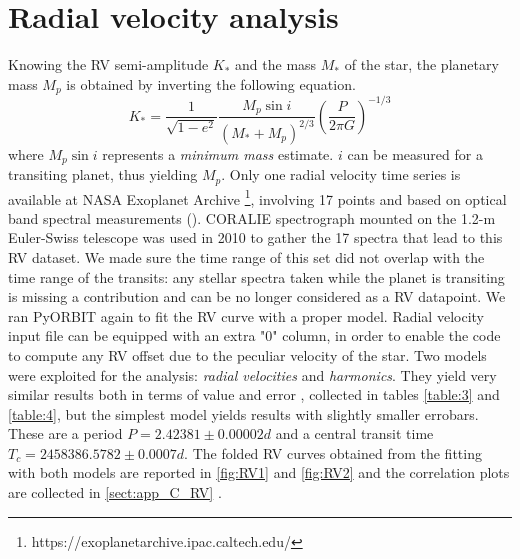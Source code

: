 \documentclass[a4paper,11pt,twocolumn]{article}
\begin{document}
\section{Radial velocity analysis}
Knowing the RV semi-amplitude $K_*$ and the mass $M_*$ of the star,
the planetary mass $M_p$ is obtained by inverting the following equation. 
\begin{equation}
    K_* = \frac{1}{\sqrt{1-e^2}}\frac{M_p \sin{i}}{(M_*+M_p)^{2/3}}\left(\frac{P}{2\pi G}\right)^{-1/3}
\end{equation}
where $M_p\sin{i}$ represents a \textit{minimum mass} estimate. $i$ can be 
measured for a transiting planet, thus yielding $M_p$. 
Only one radial velocity time series
is available at NASA Exoplanet Archive \footnote{https://exoplanetarchive.ipac.caltech.edu/}, 
involving 17 points and based on optical band spectral measurements 
(\cite{Anderson}). CORALIE spectrograph mounted on the 1.2-m
Euler-Swiss telescope was used in 2010 to gather the 17 spectra that lead
to this RV dataset. We made sure the time range of this set did not overlap 
with the time range of the transits: any stellar spectra taken while the planet is 
transiting is missing a contribution and can be no longer considered as a RV 
datapoint.
We ran PyORBIT again to fit the RV curve with a proper model. Radial velocity input
file can be equipped with an extra "0" column, in order to enable the code to compute
any RV offset due to the peculiar velocity of the star.
Two models were exploited for the analysis: \textit{radial velocities} and 
\textit{harmonics}. 
They yield very 
similar results both in terms of value and error , collected in tables \ref{table:3} and \ref{table:4}, but the simplest model yields results with slightly 
smaller errobars. These are a period $P=2.42381\pm0.00002d$
and a central transit time $T_c=2458386.5782\pm0.0007d$.
The folded RV curves obtained from the fitting with both models are reported in \ref{fig:RV1} and \ref{fig:RV2} and the correlation plots are collected in 
\ref{sect:app_C_RV} .

\begin{table}[h]
    \centering
     \caption{Physical parameters obtained from \textit{radial velocities} model.}
\label{table:3}
\end{table}
\end{document}
